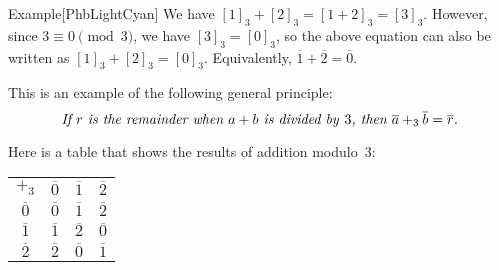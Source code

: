 \documentclass[../MATH-2000-Notes.tex]{subfiles}
\begin{document}
\begin{commentbox}{Example}[{PhbLightCyan}]
    We have $[1]_3 + [2]_3 = [1 + 2]_3 = [3]_3$. However, since $3 \equiv 0 \pmod{3}$, we have $[3]_3 = [0]_3$, so the above equation can also be written as $[1]_3 + [2]_3 = [0]_3$. Equivalently, $\overline{1} + \overline{2} = \overline{0}$.

    This is an example of the following general principle:
    $$ \text{%
            \it If $r$ is the remainder when $a + b$ is divided by\/~$3$, then $\overline{a} \mathbin{+_3} \overline{b} = \overline{r}$.} $$

    Here is a table that shows the results of addition modulo~$3$:
    \begin{center} \begin{tabular}{c||c|c|c}
            $+_3$          & $\overline{0}$ & $\overline{1}$ & $\overline{2}$ \\
            \noalign{\hrule}
            \noalign{\smallskip}
            \noalign{\hrule}
            $\overline{0}$ & $\overline{0}$ & $\overline{1}$ & $\overline{2}$ \\
            \noalign{\hrule}
            $\overline{1}$ & $\overline{1}$ & $\overline{2}$ & $\overline{0}$ \\
            \noalign{\hrule}
            $\overline{2}$ & $\overline{2}$ & $\overline{0}$ & $\overline{1}$ \\
        \end{tabular}
    \end{center}
\end{commentbox}
\end{document}
